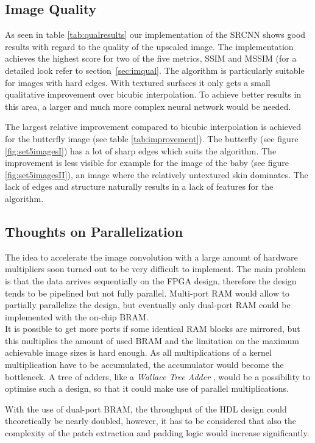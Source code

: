 \documentclass[
			fontsize = 12pt,
			paper = a4
			]
			{scrartcl}%
\newcommand{\?}{\ensuremath{^\texttt{\textbf [CITATION~NEEDED]}}}
\begin{document}
\subsection{Image Quality}
As seen in table \ref{tab:qualresults} our implementation of the SRCNN shows good results with regard to the quality of the upscaled image. The implementation achieves the highest score for two of the five metrics, SSIM and MSSIM (for a detailed look refer to section~\ref{sec:imqual}. The algorithm is particularly suitable for images with hard edges. With textured surfaces it only gets a small qualitative improvement over bicubic interpolation. To achieve better results in this area, a larger and much more complex neural network would be needed.

The largest relative improvement compared to bicubic interpolation is achieved for the butterfly image (see table \ref{tab:improvement}). The butterfly (see figure \ref{fig:set5imagesI}) has a lot of sharp edges which suits the algorithm. The improvement is less visible for example for the image of the baby (see figure \ref{fig:set5imagesII}), an image where the relatively untextured skin dominates. The lack of edges and structure naturally results in a lack of features for the algorithm.

\subsection{Thoughts on Parallelization}

The idea to accelerate the image convolution with a large amount of hardware multipliers soon turned out to be very difficult to implement. The main problem is that the data arrives sequentially on the FPGA design, therefore the design tends to be pipelined but not fully parallel.
Multi-port RAM would allow to partially parallelize the design, but eventually only dual-port RAM could be implemented with the on-chip BRAM.\\
It is possible to get more ports if some identical RAM blocks are mirrored, but this multiplies the amount of used BRAM and the limitation on the maximum achievable image sizes is hard enough.
As all multiplications of a kernel multiplication have to be accumulated, the accumulator would become the bottleneck. A tree of adders, like a \emph{Wallace Tree Adder} \cite{sharma2016design}, would be a possibility to optimise such a design, so that it could make use of parallel multiplications.

With the use of dual-port BRAM, the throughput of the HDL design could theoretically be nearly doubled, however, it has to be considered that also the complexity of the patch extraction and padding logic would increase significantly.
\end{document}
